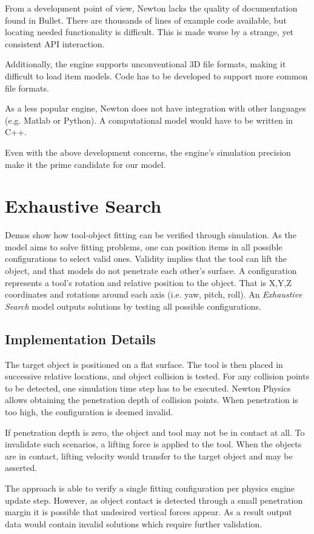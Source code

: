 \documentclass[11]{article}
\begin{document}
From a development point of view, Newton lacks the quality of documentation found in Bullet. 
There are thousands of lines of example code available, but locating needed functionality is difficult. 
This is made worse by a strange, yet consistent API interaction.

Additionally, the engine supports unconventional 3D file formats, making it difficult to load item models.
Code has to be developed to support more common file formats.

As a less popular engine, Newton does not have integration with other languages (e.g. Matlab or Python). 
A computational model would have to be written in C++.

Even with the above development concerns, the engine's simulation precision make it the prime candidate for our model.  

\section{Exhaustive Search}
Demos show how tool-object fitting can be verified through simulation.
As the model aims to solve fitting problems, one can position items in all possible configurations to select valid ones. 
Validity implies that the tool can lift the object, and that models do not penetrate each other's surface.
A configuration represents a tool's rotation and relative position to the object.
That is X,Y,Z coordinates and rotations around each axis (i.e. yaw, pitch, roll). 
An \emph{Exhaustive Search} model outputs solutions by testing all possible configurations.

\subsection{Implementation Details}
The target object is positioned on a flat surface. 
The tool is then placed in successive relative locations, and object collision is tested. 
For any collision points to be detected, one simulation time step has to be executed.
Newton Physics allows obtaining the penetration depth of collision points. 
When penetration is too high, the configuration is deemed invalid. 

If penetration depth is zero, the object and tool may not be in contact at all. 
To invalidate such scenarios, a lifting force is applied to the tool.
When the objects are in contact, lifting velocity would transfer to the target object and may be asserted. 

The approach is able to verify a single fitting configuration per physics engine update step.
However, as object contact is detected through a small penetration margin it is possible that undesired vertical forces appear.
As a result output data would contain invalid solutions which require further validation.
\end{document}
